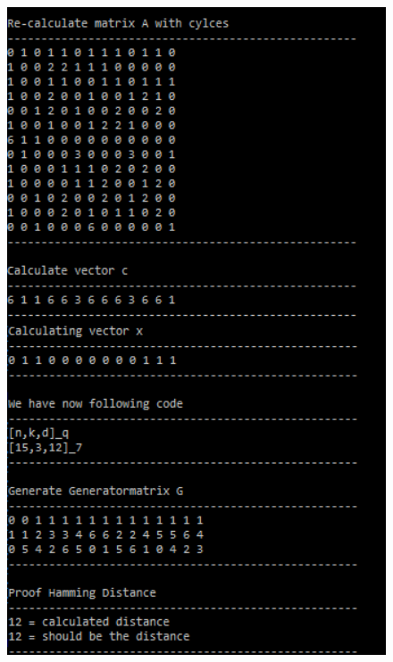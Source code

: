 \documentclass[12pt, titlepage]{article}
\begin{document}
\begin{figure}
	\centering
	\includegraphics[width=1.0\textwidth]{screenshot/result.png}
 \end{figure}


















	
\end{document}
